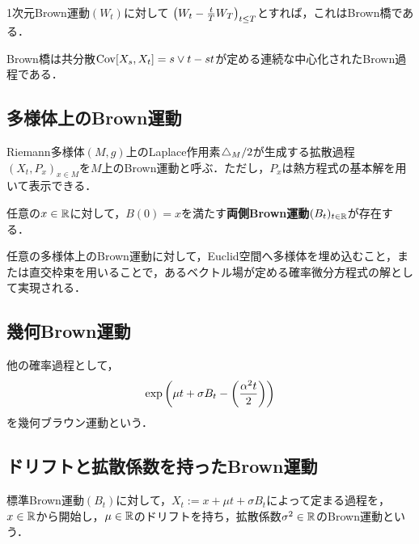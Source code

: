 \documentclass[uplatex,dvipdfmx]{jsreport}
\begin{document}
\begin{construction}
    1次元Brown運動$(W_t)$に対して
    $\left(W_t-\frac{t}{T}W_T\right)_{t\le T}$とすれば，これはBrown橋である．
\end{construction}

\begin{proposition}
    Brown橋は共分散$\mathrm{Cov}[X_s,X_t]=s\lor t-st$が定める連続な中心化されたBrown過程である．
\end{proposition}

\subsection{多様体上のBrown運動}

\begin{definition}
    Riemann多様体$(M,g)$上のLaplace作用素$\mathop{}\!\mathbin\bigtriangleup_M/2$が生成する拡散過程$(X_t,P_x)_{x\in M}$を$M$上のBrown運動と呼ぶ．ただし，$P_x$は熱方程式の基本解を用いて表示できる．
\end{definition}

\begin{proposition}
    任意の$x\in\mathbb{R}$に対して，$B(0)=x$を満たす\textbf{両側Brown運動}$(B_t)_{t\in\mathbb{R}}$が存在する．
\end{proposition}

\begin{proposition}
    任意の多様体上のBrown運動に対して，Euclid空間へ多様体を埋め込むこと，または直交枠束を用いることで，あるベクトル場が定める確率微分方程式の解として実現される．
\end{proposition}

\subsection{幾何Brown運動}

\begin{example}
    他の確率過程として，
    \[\exp\left(\mu t+\sigma B_t-\left(\frac{\alpha^2t}{2}\right)\right)\]
    を幾何ブラウン運動という．
\end{example}

\subsection{ドリフトと拡散係数を持ったBrown運動}

\begin{example}
    標準Brown運動$(B_t)$に対して，$X_t:=x+\mu t+\sigma B_t$によって定まる過程を，$x\in\mathbb{R}$から開始し，$\mu\in\mathbb{R}$のドリフトを持ち，拡散係数$\sigma^2\in\mathbb{R}$のBrown運動という．
\end{example}
\end{document}
